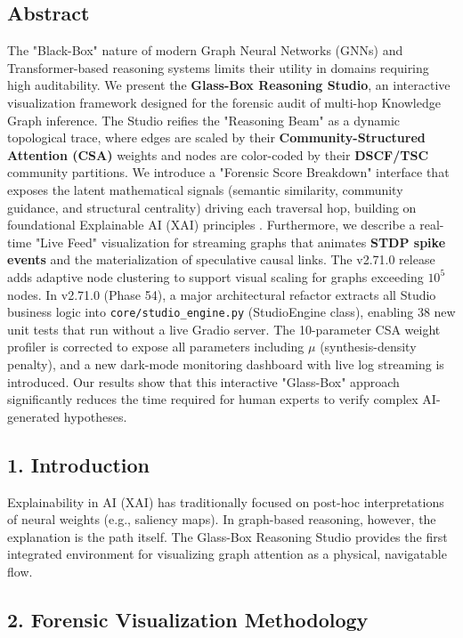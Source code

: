 
\subsection*{Abstract}
The "Black-Box" nature of modern Graph Neural Networks (GNNs) and Transformer-based reasoning systems limits their utility in domains requiring high auditability. We present the \textbf{Glass-Box Reasoning Studio}, an interactive visualization framework designed for the forensic audit of multi-hop Knowledge Graph inference. The Studio reifies the "Reasoning Beam" as a dynamic topological trace, where edges are scaled by their \textbf{Community-Structured Attention (CSA)} weights and nodes are color-coded by their \textbf{DSCF/TSC} community partitions. We introduce a "Forensic Score Breakdown" interface that exposes the latent mathematical signals (semantic similarity, community guidance, and structural centrality) driving each traversal hop, building on foundational Explainable AI (XAI) principles \cite{samek2017explainable, ribeiro2016lime, lundberg2017shap}. Furthermore, we describe a real-time "Live Feed" visualization for streaming graphs that animates \textbf{STDP spike events} and the materialization of speculative causal links. The v2.71.0 release adds adaptive node clustering to support visual scaling for graphs exceeding $10^5$ nodes. In v2.71.0 (Phase 54), a major architectural refactor extracts all Studio business logic into \texttt{core/studio\_engine.py} (StudioEngine class), enabling 38 new unit tests that run without a live Gradio server. The 10-parameter CSA weight profiler is corrected to expose all parameters including $\mu$ (synthesis-density penalty), and a new dark-mode monitoring dashboard with live log streaming is introduced. Our results show that this interactive "Glass-Box" approach significantly reduces the time required for human experts to verify complex AI-generated hypotheses.

\subsection*{1. Introduction}
Explainability in AI (XAI) has traditionally focused on post-hoc interpretations of neural weights (e.g., saliency maps). In graph-based reasoning, however, the explanation is the path itself. The Glass-Box Reasoning Studio provides the first integrated environment for visualizing graph attention as a physical, navigatable flow.

\subsection*{2. Forensic Visualization Methodology}

